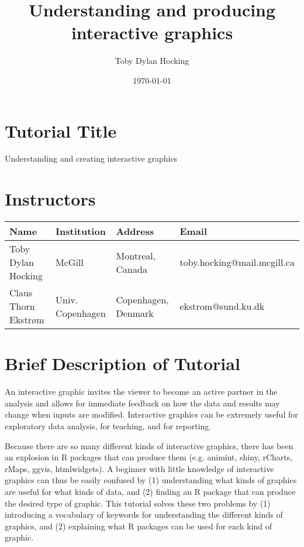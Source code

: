 \documentclass[11pt]{article}
\author{Toby Dylan Hocking}
\date{\today}
\title{Understanding and producing interactive graphics}
\begin{document}



\section{Tutorial Title}
\label{sec:orgheadline2}

Understanding and creating interactive graphics

\section{Instructors}
\label{sec:orgheadline3}

\begin{center}
\begin{tabular}{llll}
Name & Institution & Address & Email\\
\hline
Toby Dylan Hocking & McGill & Montreal, Canada & toby.hocking@mail.mcgill.ca\\
Claus Thorn Ekstrøm & Univ. Copenhagen & Copenhagen, Denmark & ekstrom@sund.ku.dk\\
\end{tabular}
\end{center}

\section{Brief Description of Tutorial}
\label{sec:orgheadline5}

An interactive graphic invites the viewer to become an active partner
in the analysis and allows for immediate feedback on how the data and
results may change when inputs are modified. Interactive graphics can
be extremely useful for exploratory data analysis, for teaching, and
for reporting.

Because there are so many different kinds of interactive graphics,
there has been an explosion in R packages that can produce them
(e.g. animint, shiny, rCharts, rMaps, ggvis, htmlwidgets). A beginner
with little knowledge of interactive graphics can thus be easily
confused by (1) understanding what kinds of graphics are useful for
what kinds of data, and (2) finding an R package that can produce the
desired type of graphic. This tutorial solves these two problems by
(1) introducing a vocabulary of keywords for understanding the
different kinds of graphics, and (2) explaining what R packages can be
used for each kind of graphic.
\end{document}
